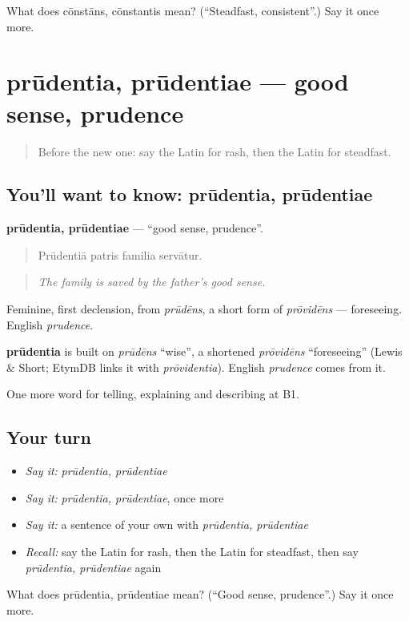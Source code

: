 \begin{tcolorbox}[breakable,colback=teal!4,colframe=teal!35!black,title={Before you move on}]
What does cōnstāns, cōnstantis mean? (\textquotedblleft{}Steadfast, consistent\textquotedblright{}.) Say it once more.
\end{tcolorbox}
\section[prūdentia, prūdentiae]{prūdentia, prūdentiae — good sense, prudence}

\label{lesson:LA-C509-prudentia}



\begin{quote}
Before the new one: say the Latin for rash, then the Latin for steadfast.
\end{quote}

\subsection*{You'll want to know: prūdentia, prūdentiae}
\textbf{prūdentia, prūdentiae} — \textquotedblleft{}good sense, prudence\textquotedblright{}.

\begin{quote}
Prūdentiā patris familia servātur.
\end{quote}

\begin{quote}
\emph{The family is saved by the father's good sense.}
\end{quote}

Feminine, first declension, from \emph{prūdēns}, a short form of \emph{prōvidēns} — foreseeing. English \emph{prudence}.

\begin{cousinweb}
\textbf{prūdentia} is built on \emph{prūdēns} \textquotedblleft{}wise\textquotedblright{}, a shortened \emph{prōvidēns} \textquotedblleft{}foreseeing\textquotedblright{} (Lewis \& Short; EtymDB links it with \emph{prōvidentia}). English \emph{prudence} comes from it.
\end{cousinweb}

\begin{grammarlens}[title={What you've built}]
One more word for telling, explaining and describing at B1.
\end{grammarlens}

\subsection*{Your turn}
\begin{itemize}
\raggedright
  \item \emph{Say it:} \emph{prūdentia, prūdentiae}
  \item \emph{Say it:} \emph{prūdentia, prūdentiae}, once more
  \item \emph{Say it:} a sentence of your own with \emph{prūdentia, prūdentiae}
  \item \emph{Recall:} say the Latin for rash, then the Latin for steadfast, then say \emph{prūdentia, prūdentiae} again
\end{itemize}

\begin{tcolorbox}[breakable,colback=teal!4,colframe=teal!35!black,title={Before you move on}]
What does prūdentia, prūdentiae mean? (\textquotedblleft{}Good sense, prudence\textquotedblright{}.) Say it once more.
\end{tcolorbox}
